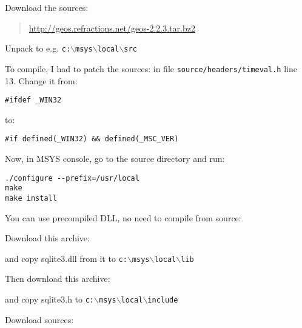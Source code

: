 \hypertarget{toc69}{}
Download the sources:

	\begin{quotation}
\url{http://geos.refractions.net/geos-2.2.3.tar.bz2}
	\end{quotation}

Unpack to e.g. \texttt{c:$\backslash$msys$\backslash$local$\backslash$src}

To compile, I had to patch the sources: in file \texttt{source/headers/timeval.h} line 13.
Change it from:

\begin{verbatim}
#ifdef _WIN32
\end{verbatim}
to:

\begin{verbatim}
#if defined(_WIN32) && defined(_MSC_VER)
\end{verbatim}

Now, in MSYS console, go to the source directory and run:

\begin{verbatim}
./configure --prefix=/usr/local
make
make install
\end{verbatim}

\hypertarget{toc70}{}
You can use precompiled DLL, no need to compile from source:

Download this archive:

	\begin{quotation}
	\end{quotation}

and copy sqlite3.dll from it to \texttt{c:$\backslash$msys$\backslash$local$\backslash$lib}

Then download this archive:

	\begin{quotation}
	\end{quotation}

and copy sqlite3.h to \texttt{c:$\backslash$msys$\backslash$local$\backslash$include}

\hypertarget{toc71}{}
Download sources:

	\begin{quotation}
	\end{quotation}

